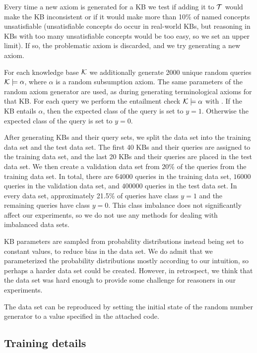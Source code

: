 Every time a new axiom is generated for a KB we test if adding it to $\mathcal{T}$ would make the KB inconsistent or if it would make more than 10\% of named concepts unsatisfiable (unsatisfiable concepts do occur in real-world KBs, but reasoning in KBs with too many unsatisfiable concepts would be too easy, so we set an upper limit).
If so, the problematic axiom is discarded, and we try generating a new axiom.

For each knowledge base $\mathcal{K}$ we additionally generate 2000 unique random queries $\mathcal{K} \models \alpha$, where $\alpha$ is a random subsumption axiom.
The same parameters of the random axiom generator are used, as during generating terminological axioms for that KB.
For each query we perform the entailment check $\mathcal{K} \models \alpha$ with \factpp{}.
If the KB entails $\alpha$, then the expected class of the query is set to $y = 1$.
Otherwise the expected class of the query is set to $y = 0$.

After generating KBs and their query sets, we split the data set into the training data set and the test data set.
The first 40 KBs and their queries are assigned to the training data set, and the last 20 KBs and their queries are placed in the test data set.
We then create a validation data set from 20\% of the queries from the training data set.
In total, there are $64 000$ queries in the training data set, $16 000$ queries in the validation data set, and $40 0000$ queries in the test data set.
In every data set, approximately 21.5\% of queries have class $y = 1$ and the remaining queries have class $y = 0$.
This class imbalance does not significantly affect our experiments, so we do not use any methods for dealing with imbalanced data sets.

KB parameters are sampled from probability distributions instead being set to constant values, to reduce bias in the data set.
We do admit that we parameterized the probability distributions mostly according to our intuition, so perhaps a harder data set could be created.
However, in retrospect, we think that the data set was hard enough to provide some challenge for reasoners in our experiments.

The data set can be reproduced by setting the initial state of the random number generator to a value specified in the attached code.

\subsection{Training details}

